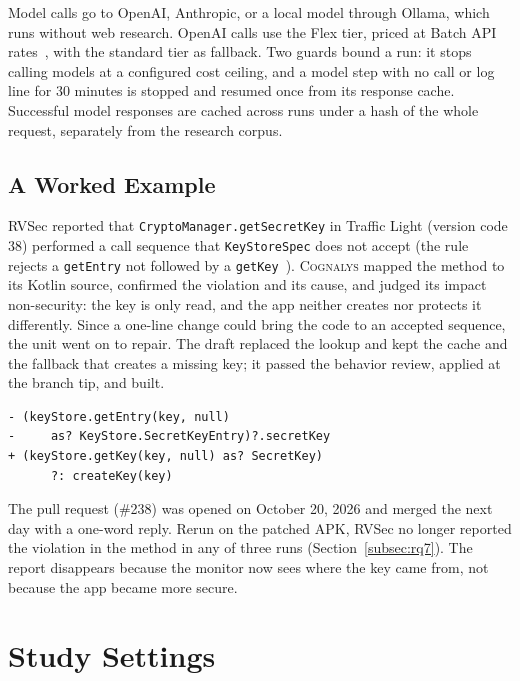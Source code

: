 \documentclass[conference]{IEEEtran}
\newcommand{\system}{\textsc{Cognalys}}
\begin{document}
Model calls go to OpenAI, Anthropic, or a local model through Ollama, which runs
without web research. OpenAI calls use the Flex tier, priced at Batch API
rates~\cite{openai2026flex}, with the standard tier as fallback. Two guards
bound a run: it stops calling models at a configured cost ceiling, and a model
step with no call or log line for 30 minutes is stopped and resumed once from
its response cache. Successful model responses are cached across runs under a
hash of the whole request, separately from the research corpus.

\subsection{A Worked Example}

RVSec reported that \texttt{CryptoManager.getSecretKey} in Traffic Light
(version code 38) performed a call sequence that \texttt{KeyStoreSpec} does not
accept (the rule rejects a \texttt{getEntry} not followed by a
\texttt{getKey}~\cite{costa2026effectiveness}). \system{} mapped the method to its Kotlin source,
confirmed the violation and its cause, and judged its impact non-security: the
key is only read, and the app neither creates nor protects it differently.
Since a one-line change could bring the code to an accepted sequence, the unit
went on to repair. The draft replaced the lookup and kept the cache and the
fallback that creates a missing key; it passed the behavior review, applied at
the branch tip, and built.

{\scriptsize
\begin{verbatim}
- (keyStore.getEntry(key, null)
-     as? KeyStore.SecretKeyEntry)?.secretKey
+ (keyStore.getKey(key, null) as? SecretKey)
      ?: createKey(key)
\end{verbatim}}

The pull request (\#238) was opened on October 20, 2026 and merged the next day with a
one-word reply. Rerun on the patched APK, RVSec no longer reported the
violation in the method in any of three runs (Section~\ref{subsec:rq7}). The
report disappears because the monitor now sees where the key came from, not
because the app became more secure.

\section{Study Settings}
\label{sec:settings}
\end{document}
